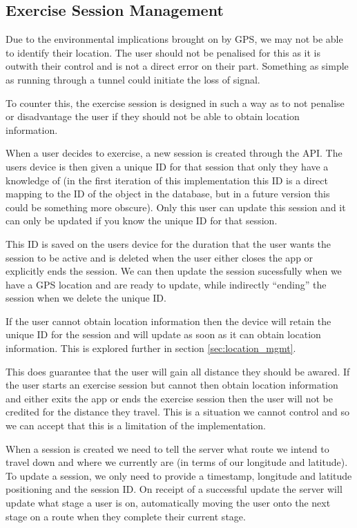 \subsection{Exercise Session Management}
\label{sec:session_mgmt}
Due to the environmental implications brought on by GPS, we may not be
able to identify their location. The user should not
be penalised for this as it is outwith their control and is not a
direct error on their part. Something as simple as running through a
tunnel could initiate the loss of signal. 

To counter this, the exercise session is designed in such a way as to
not penalise or disadvantage the user if they should not be able to
obtain location information. 

When a user decides to exercise, a new session is created through the
API. The users device is then given a unique ID for that session that
only they have a knowledge of (in the first iteration of this
implementation this ID is a direct mapping to the ID of the object in
the database, but in a future version this could be something more
obscure). Only this user can update this session and it can only be
updated if you know the unique ID for that session. 

This ID is saved on the users device for the duration that the user
wants the session to be active and is deleted when the user either
closes the app or explicitly ends the session. We can then update the
session sucessfully when we have a GPS location and are ready to
update, while indirectly ``ending'' the session when we delete the
unique ID.

If the user cannot obtain location information then the device will
retain the unique ID for the session and will update as soon as it can
obtain location information. This is explored further in section
\ref{sec:location_mgmt}.

This does guarantee that the user will gain all distance they should
be awared. If the user starts an exercise session but cannot then
obtain location information and either exits the app or ends the
exercise session then the user will not be credited for the distance
they travel. This is a situation we cannot control and so we can
accept that this is a limitation of the implementation.

When a session is created we need to tell the server what route we
intend to travel down and where we currently are (in terms of our
longitude and latitude). To update a session, we only need to provide
a timestamp, longitude and latitude positioning and the session
ID. On receipt of a successful update the server will update what
stage a user is on, automatically moving the user onto the next stage
on a route when they complete their current stage. 

